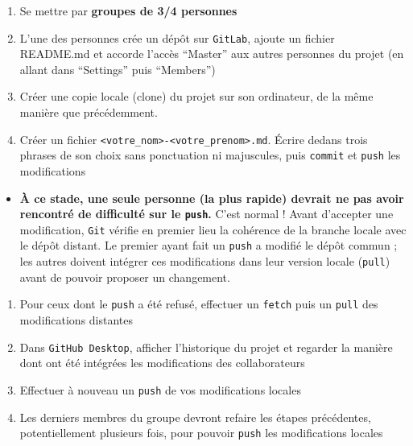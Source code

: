 \documentclass[
  letterpaper,
  DIV=11,
  numbers=noendperiod]{scrartcl}
\providecommand{\tightlist}{%
  \setlength{\itemsep}{0pt}\setlength{\parskip}{0pt}}\usepackage{longtable,booktabs,array}
\begin{document}
\begin{tcolorbox}[enhanced jigsaw, colframe=quarto-callout-tip-color-frame, rightrule=.15mm, breakable, colbacktitle=quarto-callout-tip-color!10!white, coltitle=black, toptitle=1mm, title={Synchronisation des dépôts}, titlerule=0mm, leftrule=.75mm, colback=white, bottomrule=.15mm, bottomtitle=1mm, toprule=.15mm, opacitybacktitle=0.6, arc=.35mm, left=2mm, opacityback=0]

\begin{enumerate}
\def\labelenumi{\arabic{enumi}.}
\tightlist
\item
  Se mettre par {\textbf{groupes de 3/4 personnes}}
\item
  L'une des personnes crée un dépôt sur \texttt{GitLab}, ajoute un
  fichier README.md et accorde l'accès ``Master'' aux autres personnes
  du projet (en allant dans ``Settings'' puis ``Members'')
\item
  Créer une copie locale (clone) du projet sur son ordinateur, de la
  même manière que précédemment.
\item
  Créer un fichier
  \texttt{\textless{}votre\_nom\textgreater{}-\textless{}votre\_prenom\textgreater{}.md}.
  Écrire dedans trois phrases de son choix sans ponctuation ni
  majuscules, puis \texttt{commit} et \texttt{push} les modifications
\end{enumerate}

\begin{itemize}
\tightlist
\item
  \textbf{À ce stade, une seule personne (la plus rapide) devrait ne pas
  avoir rencontré de difficulté sur le \texttt{push}.} C'est normal !
  Avant d'accepter une modification, \texttt{Git} vérifie en premier
  lieu la cohérence de la branche locale avec le dépôt distant. Le
  premier ayant fait un \texttt{push} a modifié le dépôt commun ; les
  autres doivent intégrer ces modifications dans leur version locale
  (\texttt{pull}) avant de pouvoir proposer un changement.
\end{itemize}

\begin{enumerate}
\def\labelenumi{\arabic{enumi}.}
\setcounter{enumi}{4}
\tightlist
\item
  Pour ceux dont le \texttt{push} a été refusé, effectuer un
  \texttt{fetch} puis un \texttt{pull} des modifications distantes
\item
  Dans \texttt{GitHub\ Desktop}, afficher l'historique du projet et
  regarder la manière dont ont été intégrées les modifications des
  collaborateurs
\item
  Effectuer à nouveau un \texttt{push} de vos modifications locales
\item
  Les derniers membres du groupe devront refaire les étapes précédentes,
  potentiellement plusieurs fois, pour pouvoir \texttt{push} les
  modifications locales
\end{enumerate}

\end{tcolorbox}
\end{document}
